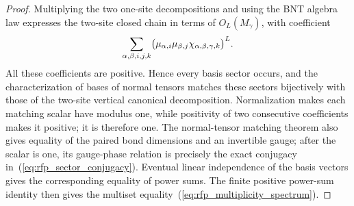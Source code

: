 \begin{proof}\leanok
    Multiplying the two one-site decompositions and using the BNT algebra law
    expresses the two-site closed chain in terms of $O_L(M_\gamma)$, with
    coefficient
    \begin{align}
        \sum_{\alpha,\beta,i,j,k}
        \bigl(\mu_{\alpha,i}\mu_{\beta,j}
        \chi_{\alpha,\beta,\gamma,k}\bigr)^L.
        \notag
    \end{align}
    All these coefficients are positive. Hence every basis sector occurs,
    and the characterization of bases of normal tensors matches these sectors
    bijectively with those of the two-site vertical canonical decomposition.
    Normalization makes each matching scalar have modulus one, while
    positivity of two consecutive coefficients makes it positive; it is
    therefore one. The normal-tensor matching theorem also gives equality
    of the paired bond dimensions and an invertible gauge; after the scalar is
    one, its gauge-phase relation is precisely the exact conjugacy
    in~(\ref{eq:rfp_sector_conjugacy}).
    Eventual linear independence of the basis vectors gives the corresponding
    equality of power sums. The finite positive power-sum identity then gives
    the multiset equality~(\ref{eq:rfp_multiplicity_spectrum}).
\end{proof}

